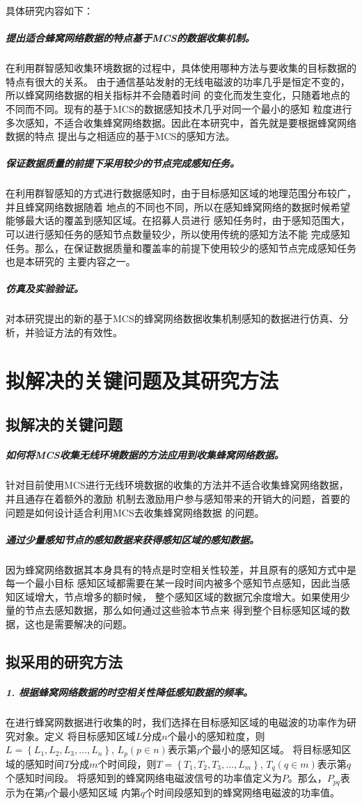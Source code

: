 \documentclass[UTF8]{ctexart}
\begin{document}
具体研究内容如下：

\subparagraph{提出适合蜂窝网络数据的特点基于MCS的数据收集机制。}
在利用群智感知收集环境数据的过程中，具体使用哪种方法与要收集的目标数据的特点有很大的关系。
由于通信基站发射的无线电磁波的功率几乎是恒定不变的，所以蜂窝网络数据的相关指标并不会随着时间
的变化而发生变化，只随着地点的不同而不同。现有的基于MCS的数据感知技术几乎对同一个最小的感知
粒度进行多次感知，不适合收集蜂窝网络数据。因此在本研究中，首先就是要根据蜂窝网络数据的特点
提出与之相适应的基于MCS的感知方法。

\subparagraph{保证数据质量的前提下采用较少的节点完成感知任务。}
在利用群智感知的方式进行数据感知时，由于目标感知区域的地理范围分布较广，并且蜂窝网络数据随着
地点的不同也不同，所以在感知蜂窝网络的数据时候希望能够最大话的覆盖到感知区域。在招募人员进行
感知任务时，由于感知范围大，可以进行感知任务的感知节点数量较少，所以使用传统的感知方法不能
完成感知任务。那么，在保证数据质量和覆盖率的前提下使用较少的感知节点完成感知任务也是本研究的
主要内容之一。

\subparagraph{仿真及实验验证。}
对本研究提出的新的基于MCS的蜂窝网络数据收集机制感知的数据进行仿真、分析，并验证方法的有效性。

\section{拟解决的关键问题及其研究方法}
\subsection{拟解决的关键问题}
\subparagraph{如何将MCS收集无线环境数据的方法应用到收集蜂窝网络数据。}
针对目前使用MCS进行无线环境数据的收集的方法并不适合收集蜂窝网络数据，并且通存在着额外的激励
机制去激励用户参与感知带来的开销大的问题，首要的问题是如何设计适合利用MCS去收集蜂窝网络数据
的问题。

\subparagraph{通过少量感知节点的感知数据来获得感知区域的感知数据。}
因为蜂窝网络数据其本身具有的特点是时空相关性较差，并且原有的感知方式中是每一个最小目标
感知区域都需要在某一段时间内被多个感知节点感知，因此当感知区域增大，节点增多的额时候，
整个感知区域的数据冗余度增大。如果使用少量的节点去感知数据，那么如何通过这些验本节点来
得到整个目标感知区域的数据，这也是需要解决的问题。

\subsection{拟采用的研究方法}
\subparagraph{1. 根据蜂窝网络数据的时空相关性降低感知数据的频率。}
在进行蜂窝网数据进行收集的时，我们选择在目标感知区域的电磁波的功率作为研究对象。定义
将目标感知区域$L$分成$n$个最小的感知粒度，则$L=\left\{L_1,L_2,L_3,\dots,L_n\right\}$,
$L_p (p \in n)$表示第$p$个最小的感知区域。
将目标感知区域的感知时间$T$分成$m$个时间段，则$T=\left\{T_1,T_2,T_3,\dots,L_m\right\}$,
$T_q (q \in m)$表示第$q$个感知时间段。
将感知到的蜂窝网络电磁波信号的功率值定义为$P$。那么，$P_{pq}$表示为在第$p$个最小感知区域
内第$q$个时间段感知到的蜂窝网络电磁波的功率值。
\end{document}
